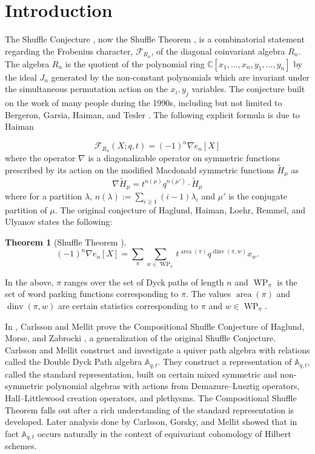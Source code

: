 \documentclass[11pt]{article}
\newtheorem{thm}[theo]{Theorem}
\theoremstyle{definition}
\numberwithin{equation}{section}
\DeclareMathOperator{\WP}{WP}
\DeclareMathOperator{\area}{area}
\DeclareMathOperator{\dinv}{dinv}
\begin{document}
\section{Introduction}\label{intro section}
The Shuffle Conjecture \cite{HHLRU-2003}, now the Shuffle Theorem \cite{CM_2015}, is a combinatorial statement regarding the Frobenius character, $\mathcal{F}_{R_n}$, of the diagonal coinvariant algebra $R_n.$ The algebra $R_n$ is the quotient of the polynomial ring $\mathbb{C}[x_1,\ldots,x_n,y_1,\ldots,y_n]$ by the ideal $J_n$ generated by the non-constant polynomials which are invariant under the simultaneous permutation action on the $x_i,y_j$ variables.
The conjecture built on the work of many people during the 1990s, including but not limited to Bergeron, Garsia, Haiman,  and Tesler \cite{BGSciFi, GHCat, BGHT}.
The following explicit formula is due to Haiman \cite{HVanish}

    $$ \mathcal{F}_{R_n}(X;q,t) = (-1)^n \nabla e_n[X] $$
    where the operator $\nabla$ is a diagonalizable operator on symmetric functions prescribed by its action on the modified Macdonald symmetric functions  $\widetilde{H}_{\mu}$  as
    $$\nabla \widetilde{H}_{\mu} = t^{n(\mu)} q^{n(\mu')}\cdot  \widetilde{H}_{\mu} $$ where for a partition $\lambda$, $n(\lambda):= \sum_{i \geq 1}(i-1)\lambda_i$ and $\mu'$ is the conjugate partition of $\mu.$
    The original conjecture of Haglund, Haiman, Loehr, Remmel, and Ulyanov \cite{HHLRU-2003} states the following:
        
\begin{thm}[Shuffle Theorem \cite{CM_2015}]

$$ (-1)^n \nabla e_n[X] = \sum_{\pi}\sum_{ w \in \WP_{\pi}} t^{\area(\pi)} q^{\dinv(\pi,w)} x_{w}. $$

\end{thm}

In the above, $\pi$ ranges over the set of Dyck paths of length $n$ and $\WP_{\pi}$ is the set of word parking functions corresponding to $\pi$. The values $\area(\pi)$ and $\dinv(\pi,w)$ are certain statistics corresponding to $\pi$ and $w \in \WP_{\pi}$.


In \cite{CM_2015}, Carlsson and Mellit prove the Compositional Shuffle Conjecture of Haglund, Morse, and Zabrocki \cite{HMZ}, a generalization of the original Shuffle Conjecture. Carlsson and Mellit construct and investigate a quiver path algebra with relations called the Double Dyck Path algebra $\mathbb{A}_{q,t}$. They construct a representation of $\mathbb{A}_{q,t}$, called the standard representation, built on certain mixed symmetric and non-symmetric polynomial algebras with actions from Demazure--Lusztig operators, Hall--Littlewood creation operators, and plethysms. The Compositional Shuffle Theorem 
falls out after a rich understanding of the standard representation is developed. Later analysis done by Carlsson, Gorsky, and Mellit \cite{GCM_2017} showed that in fact $\mathbb{A}_{q,t}$ occurs naturally in the context of equivariant cohomology of Hilbert schemes. 
\end{document}
